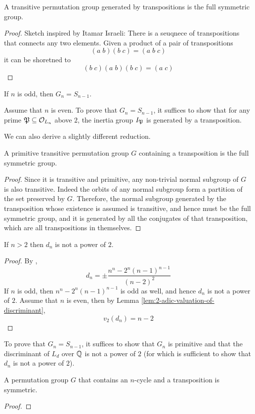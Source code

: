 \documentclass[../main.tex]{subfiles}
\begin{document}
\begin{lemma}
  A transitive permutation group generated by transpositions is the full symmetric group.
\end{lemma}
\begin{proof}
  Sketch inspired by Itamar Israeli:
  There is a seuqnece of transpositions that connects any two elements.
  Given a product of a pair of transpositions 
  \[
    \left( a \; b \right) \left( b \; c \right) = \left( a \; b \; c \right)
  \]
  it can be shoretned to 
  \[
    \left( b \; c \right) \left( a \; b \right) \left( b \; c \right) = \left( a \; c \right) 
  \]
\end{proof}
\begin{corollary}
  If $n$ is odd, then $G_n = S_{n-1}$.
\end{corollary}
\begin{corollary}
  Assume that $n$ is even.
  To prove that $G_n = S_{n-1}$, it suffices to show that for any prime $\P \subseteq \O_{L_n}$ above $2$, the inertia group $I_{\P}$ is generated by a transposition.
\end{corollary}

We can also derive a slightly different reduction. 
\begin{lemma}
  A primitive transitive permutation group $G$ containing a transposition is the full symmetric group. 
\end{lemma}
\begin{proof}
  Since it is transitive and primitive, any non-trivial normal subgroup of $G$ is also transitive.
  Indeed the orbits of any normal subgroup form a partition of the set preserved by $G$.
  Therefore, the normal subgroup generated by the transposition whose existence is assumed is transitive, and hence must be the full symmetric group, and it is generated by all the conjugates of that transposition, which are all transpositions in themselves. 
\end{proof}
\begin{lemma}
  If $n > 2$ then $d_n$ is not a power of $2$. 
\end{lemma}
\begin{proof}
  By \cite{MARTIN2004213},
  \[
    d_n = \pm 
    \frac{n^n - 2^n \left( n - 1 \right)^{ n - 1 } }{
      \left( n - 2 \right)^2
    }
  \]
  If $n$ is odd, then $n^n - 2^n \left( n - 1 \right)^{ n - 1 }$ is odd as well, and hence $d_n$ is not a power of $2$.
  Assume that $n$ is even, then by Lemma \ref{lem:2-adic-valuation-of-discriminant},
  \[
    v_2\left( d_n \right) = n - 2
  \] 
\end{proof}
\begin{corollary}
  To prove that $G_n = S_{n-1}$, it suffices to show that $G_n$ is primitive and that the discriminant of $L_d$ over $\Q$ is not a power of $2$ (for which is sufficient to show that $d_n$ is not a power of $2$).
\end{corollary}
\begin{lemma}
  A permutation group $G$ that contains an $n$-cycle and a transposition is symmetric.
\end{lemma}
\begin{proof}
\end{proof}
\end{document}
